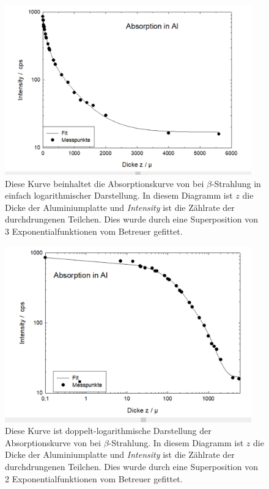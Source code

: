 \documentclass[12pt,english,ngerman]{scrartcl}
\begin{document}
\begin{figure}[H]
	\begin{center}
		\includegraphics[width = 0.95\textwidth]{figures/aluminiumabsorbtion.png}
	\end{center}
	\caption[Absorptionskurve von  bei $\beta$-Strahlung]{
		Diese Kurve beinhaltet die
		Absorptionskurve von  bei $\beta$-Strahlung in einfach logarithmischer
		Darstellung. In diesem Diagramm ist $z$ die Dicke der Aluminiumplatte und
		\emph{Intensity} ist die Zählrate der durchdrungenen Teilchen. Dies wurde durch
		eine Superposition von 3 Exponentialfunktionen vom Betreuer gefittet.
	}\label{fig:alu_absorption}
\end{figure}

\begin{figure}[H]
	\begin{center}
		\includegraphics[width = 0.95\textwidth]{figures/aluminiumdoppellog.png}
	\end{center}
	\caption[Doppelt-logarithmische Darstellung der Absorptionskurve von  bei
		$\beta$-Strahlung]{
		Diese Kurve ist doppelt-logarithmische Darstellung der
		Absorptionskurve von  bei $\beta$-Strahlung. In diesem Diagramm ist $z$
		die Dicke der Aluminiumplatte und \emph{Intensity} ist die Zählrate der
		durchdrungenen Teilchen. Dies wurde durch eine Superposition von 2
		Exponentialfunktionen vom Betreuer gefittet.
	}\label{fig:alu_doppellog}
\end{figure}
\end{document}
